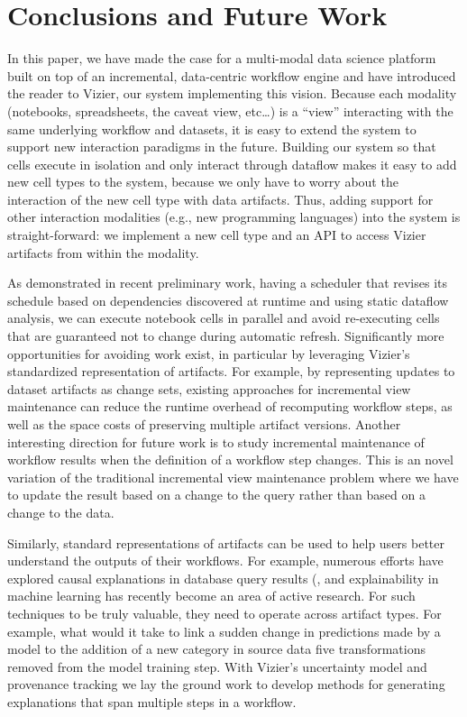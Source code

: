 \documentclass[11pt]{article}
\numberwithin{theo}{section}
\numberwithin{exam}{section}
\numberwithin{defi}{section}
\begin{document}
\section{Conclusions and Future Work}
\label{sec:conclusions}

In this paper, we have made the case for a multi-modal data science platform built on top of an incremental, data-centric workflow engine and have introduced the reader to Vizier, our system implementing this vision. 
Because each modality (notebooks, spreadsheets, the caveat view, etc\ldots) is a ``view'' interacting with the same underlying workflow and datasets, it is easy to extend the system to support new interaction paradigms in the future.  Building our system so that cells execute in isolation and only interact through dataflow makes it easy to add new cell types to the system, because we only have to worry about the interaction of the new cell type with  data artifacts. 
Thus, adding support for other interaction modalities (e.g., new programming languages) into the system is straight-forward: we implement a new cell type and an API to access Vizier artifacts from within the modality.

As demonstrated in recent preliminary work, having a scheduler that revises its schedule based on dependencies discovered at runtime and using static dataflow analysis, we can execute notebook cells in parallel and avoid re-executing cells that are guaranteed not to change during automatic refresh.
Significantly more opportunities for avoiding work exist, in particular by leveraging Vizier's standardized representation of artifacts.
For example, by representing updates to dataset artifacts as change sets, existing approaches for incremental view maintenance can reduce the runtime overhead of recomputing workflow steps, as well as the space costs of preserving multiple artifact versions. Another interesting direction for future work is to study incremental maintenance of workflow results when the definition of a workflow step changes. This is an novel variation of the traditional incremental view maintenance problem where we have to update the result based on a change to the query rather than based on a change to the data.

Similarly, standard representations of artifacts can be used to help users better understand the outputs of their workflows.
For example, numerous efforts have explored causal explanations in database query results (\cite{DBLP:conf/sigmod/KanagalLD11,DBLP:journals/pvldb/MeliouGMS11,DBLP:journals/pvldb/MeliouRS14,DBLP:journals/ftdb/GlavicMR21}, and explainability in machine learning has recently become an area of active research.
For such techniques to be truly valuable, they need to operate across artifact types. For example, what would it take to link a sudden change in predictions made by a model to the addition of a new category in source data five transformations removed from the model training step. With Vizier's uncertainty model and provenance tracking we lay the ground work to develop methods for generating explanations that span multiple steps in a workflow. 
\end{document}

